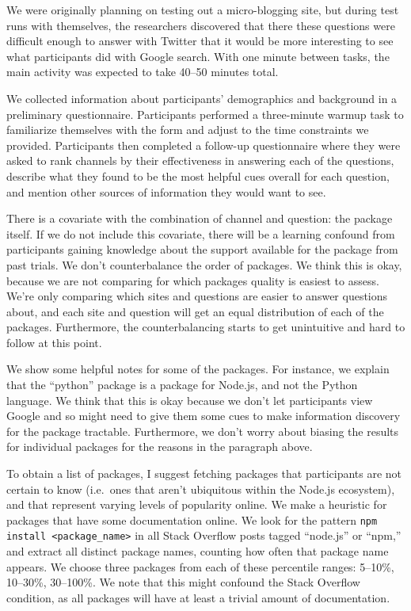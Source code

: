 We were originally planning on testing out a micro-blogging site, but during test runs with themselves, the researchers discovered that there these questions were difficult enough to answer with Twitter that it would be more interesting to see what participants did with Google search.
With one minute between tasks, the main activity was expected to take 40--50 minutes total.

We collected information about participants' demographics and background in a preliminary questionnaire.
Participants performed a three-minute warmup task to familiarize themselves with the form and adjust to the time constraints we provided.
Participants then completed a follow-up questionnaire where they were asked to rank channels by their effectiveness in answering each of the questions, describe what they found to be the most helpful cues overall for each question, and mention other sources of information they would want to see.
\fi

There is a covariate with the combination of channel and question: the package itself.
If we do not include this covariate, there will be a learning confound from participants gaining knowledge about the support available for the package from past trials.
We don't counterbalance the order of packages.
We think this is okay, because we are not comparing for which packages quality is easiest to assess.
We're only comparing which sites and questions are easier to answer questions about, and each site and question will get an equal distribution of each of the packages.
Furthermore, the counterbalancing starts to get unintuitive and hard to follow at this point.

We show some helpful notes for some of the packages.
For instance, we explain that the ``python'' package is a package for Node.js, and not the Python language.
We think that this is okay because we don't let participants view Google and so might need to give them some cues to make information discovery for the package tractable.
Furthermore, we don't worry about biasing the results for individual packages for the reasons in the paragraph above.
\fi

To obtain a list of packages, I suggest fetching packages that participants are not certain to know (i.e.\ ones that aren't ubiquitous within the Node.js ecosystem), and that represent varying levels of popularity online.
We make a heuristic for packages that have some documentation online.
We look for the pattern \texttt{npm install <package\_name>} in all Stack Overflow posts tagged ``node.js'' or ``npm,'' and extract all distinct package names, counting how often that package name appears.
We choose three packages from each of these percentile ranges: 5--10\%, 10--30\%, 30--100\%.
We note that this might confound the Stack Overflow condition, as all packages will have at least a trivial amount of documentation.

